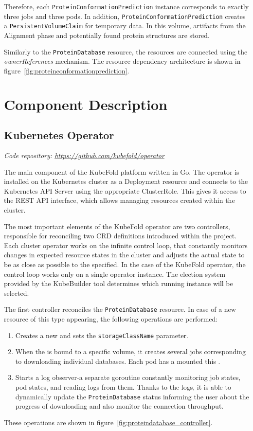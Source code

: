 Therefore, each \texttt{ProteinConformationPrediction} instance corresponds to exactly three jobs and three pods.
In addition, \texttt{ProteinConformationPrediction} creates a \texttt{PersistentVolumeClaim} for temporary data.
In this volume, artifacts from the Alignment phase and potentially found protein structures are stored.

Similarly to the \texttt{ProteinDatabase} resource, the resources are connected using the \textit{ownerReferences} mechanism.
The resource dependency architecture is shown in figure~\ref{fig:proteinconformationprediction}.


\section{Component Description}

\subsection{Kubernetes Operator}\label{subsec:component-operator}
\textit{Code repository: \url{https://github.com/kubefold/operator}}

The main component of the KubeFold platform written in Go.
The operator is installed on the Kubernetes cluster as a Deployment resource and connects to the Kubernetes API Server using the appropriate ClusterRole.
This gives it access to the REST API interface, which allows managing resources created within the cluster.

The most important elements of the KubeFold operator are two controllers, responsible for reconciling two CRD definitions introduced within the project.
Each cluster operator works on the infinite control loop, that constantly monitors changes in expected resource states in the cluster and adjusts the actual state to be as close as possible to the specified.
In the case of the KubeFold operator, the control loop works only on a single operator instance.
The election system provided by the KubeBuilder tool determines which running instance will be selected.

The first controller reconciles the \texttt{ProteinDatabase} resource.
In case of a new resource of this type appearing, the following operations are performed:
\begin{enumerate}
    \item Creates a new  and sets the \texttt{storageClassName} parameter.
    \item When the  is bound to a specific volume, it creates several jobs corresponding to downloading individual databases.
    Each pod has a mounted this .
    \item Starts a log observer-a separate goroutine constantly monitoring job states, pod states, and reading logs from them.
    Thanks to the logs, it is able to dynamically update the \texttt{ProteinDatabase} status informing the user about the progress of downloading and also monitor the connection throughput.
\end{enumerate}
These operations are shown in figure~\ref{fig:proteindatabase_controller}.

